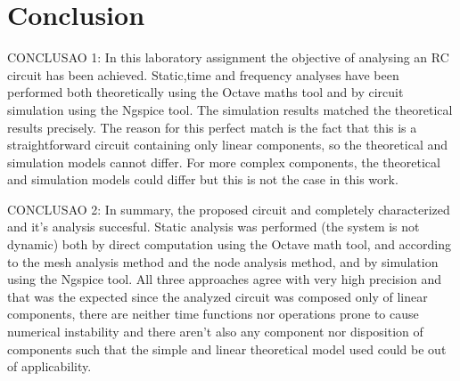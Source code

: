 \section{Conclusion}
\label{sec:conclusion}

CONCLUSAO 1: In this laboratory assignment the objective of analysing an RC circuit has been achieved. Static,time and frequency analyses have been performed both theoretically using the Octave maths tool and by circuit simulation using the Ngspice tool. The simulation results matched the theoretical results precisely. The reason for this perfect match is the fact that this is a straightforward circuit containing only linear components, so the theoretical and simulation models cannot differ. For more complex components, the theoretical and simulation models could differ but this is not the case in this work.


CONCLUSAO 2: In summary, the proposed circuit and completely characterized and it's analysis succesful. Static analysis was performed (the system is not dynamic) both by direct computation using the Octave math tool, and according to the mesh analysis method and the node analysis method, and by simulation using the Ngspice tool. All three approaches agree with very high precision and that was the expected since the analyzed circuit was composed only of linear components, there are neither time functions nor operations prone to cause numerical instability and there aren’t also any component nor disposition of components such that the simple and linear theoretical model used could be out of applicability.

